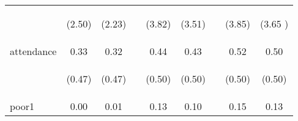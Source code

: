 \documentclass{article}[11pt,subeqn]
\begin{document}
\begin{spacing}{1.5}
\begin{table}[ht]
\begin{center}
\begin{tabular}{lccp{5mm}ccp{5mm}cc}
\begin{footnotesize}\end{footnotesize}	& \begin{footnotesize} (2.50)\end{footnotesize} & \begin{footnotesize} (2.23)\end{footnotesize} & \begin{footnotesize} 	\end{footnotesize} & \begin{footnotesize} (3.82)\end{footnotesize} & \begin{footnotesize} (3.51)\end{footnotesize} & \begin{footnotesize} 	\end{footnotesize} & \begin{footnotesize} (3.85)\end{footnotesize} & \begin{footnotesize} (3.65	)\end{footnotesize}	\\
attendance	&	0.33	&	0.32	&	&	0.44	&	0.43	&	&	0.52	&	0.50		\\
\begin{footnotesize}\end{footnotesize}	& \begin{footnotesize} (0.47)\end{footnotesize} & \begin{footnotesize} (0.47)\end{footnotesize} & \begin{footnotesize} 	\end{footnotesize} & \begin{footnotesize} (0.50)\end{footnotesize} & \begin{footnotesize} (0.50)\end{footnotesize} & \begin{footnotesize} 	\end{footnotesize} & \begin{footnotesize} (0.50)\end{footnotesize} & \begin{footnotesize} (0.50)\end{footnotesize}	\\
poor1	&	0.00	&	0.01	&	&	0.13	&	0.10	&	&	0.15	&	0.13		\\

\end{tabular}
\end{center}
\end{table}
\end{spacing}
\end{document}
